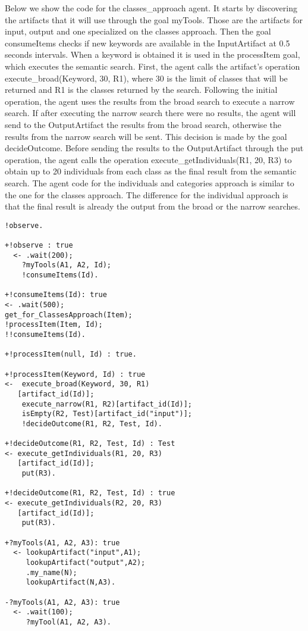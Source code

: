 \documentclass[a4paper,twoside]{article}
\begin{document}
Below we show the code for the classes\_approach agent. It starts by discovering the artifacts that it will use through the goal myTools. Those are the artifacts for input, output and  one specialized on the classes approach. Then the goal consumeItems checks if new keywords are available in the InputArtifact at 0.5 seconds intervals. When a keyword is obtained it is used in the processItem goal, which executes the semantic search. First, the agent calls the artifact's operation execute\_broad(Keyword, 30, R1), where 30 is the limit of classes that will be returned and R1 is the classes returned by the search. Following the initial operation, the agent uses the results from the broad search to execute a narrow search. If after executing the narrow search there were no results, the agent will send to the OutputArtifact the results from the broad search, otherwise the results from the narrow search will be sent. This decision is made by the goal decideOutcome. Before sending the results to the OutputArtifact through the put operation, the agent calls the operation execute\_getIndividuals(R1, 20, R3) to obtain up to 20 individuals from each class as the final result from the semantic search. The agent code for the individuals and categories approach is similar to the one for the classes approach. The difference for the individual approach is that the final result is already the output from the broad or the narrow searches.

\begin{small}
\begin{verbatim}
!observe.

+!observe : true 
  <- .wait(200); 
    ?myTools(A1, A2, Id);
    !consumeItems(Id).

+!consumeItems(Id): true
<- .wait(500);
get_for_ClassesApproach(Item);
!processItem(Item, Id);
!!consumeItems(Id).

+!processItem(null, Id) : true.

+!processItem(Keyword, Id) : true
<-  execute_broad(Keyword, 30, R1)
   [artifact_id(Id)];
	execute_narrow(R1, R2)[artifact_id(Id)];
	isEmpty(R2, Test)[artifact_id("input")];
	!decideOutcome(R1, R2, Test, Id).	

+!decideOutcome(R1, R2, Test, Id) : Test
<- execute_getIndividuals(R1, 20, R3)
   [artifact_id(Id)];
	put(R3).
	
+!decideOutcome(R1, R2, Test, Id) : true
<- execute_getIndividuals(R2, 20, R3)
   [artifact_id(Id)];
	put(R3).
	
+?myTools(A1, A2, A3): true 
  <- lookupArtifact("input",A1);
  	 lookupArtifact("output",A2);
	 .my_name(N);
	 lookupArtifact(N,A3).

-?myTools(A1, A2, A3): true 
  <- .wait(100); 
     ?myTool(A1, A2, A3).
\end{verbatim}
\end{small}
\end{document}
